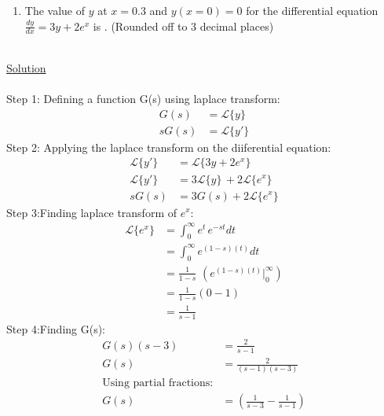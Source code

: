 \documentclass{article}
\begin{document}
\hfill\begin{minipage}{\linewidth}
\begin{enumerate}
    \item[Q.43] The value of $y$ at $x=0.3$ and $y(x=0)=0$ for the differential equation $\frac{dy}{dx}=3y+2e^x$ is \underline{\hspace{1cm}}. (Rounded off to 3 decimal places)  
\end{enumerate}    
\end{minipage}\bigskip\\
\underline{Solution}\\\\
Step 1: Defining a function G(s) using laplace transform:\\ 
\begin{align*}
    G(s)&=\mathcal{L}\{y\}\\
    sG(s)&=\mathcal{L}\{y'\} \tag{By property of laplace transform and Given y(0)=0}
\end{align*}
 Step 2: Applying the laplace transform on the diiferential equation:\\
 \begin{align*}
     \mathcal{L}\{y'\}&=\mathcal{L}\{3y+2e^x\}\\
     \mathcal{L}\{y'\}&=3\mathcal{L}\{y\}\,+2\mathcal{L}\{e^x\}\tag{Using linearity of laplace transform}\\
     sG(s)&=3G(s)+2\mathcal{L}\{e^x\}
 \end{align*}
Step 3:Finding laplace transform of $e^x$:\\
\begin{align*}
    \mathcal{L}\{e^x\}&=\int_{0}^{\infty}e^t\,e^{-st} dt\\
                      &=\int_{0}^{\infty}e^{(1-s)(t)} dt\\
                      &=\frac{1}{1-s}\,\,(e^{(1-s)(t)}\big|_{0}^{\infty})\\
                      &=\frac{1}{1-s}(0-1)\tag{Assuming that s$>$1}\\
                      &=\frac{1}{s-1}
\end{align*}
Step 4:Finding G(s):\\
\begin{align*}
    G(s)(s-3)&=\frac{2}{s-1}\\
    G(s)&=\frac{2}{(s-1)(s-3)}\\
    \text{Using partial fractions:}\\
    G(s)&=\left(\frac{1}{s-3}-\frac{1}{s-1}\right)
\end{align*}
\end{document}
